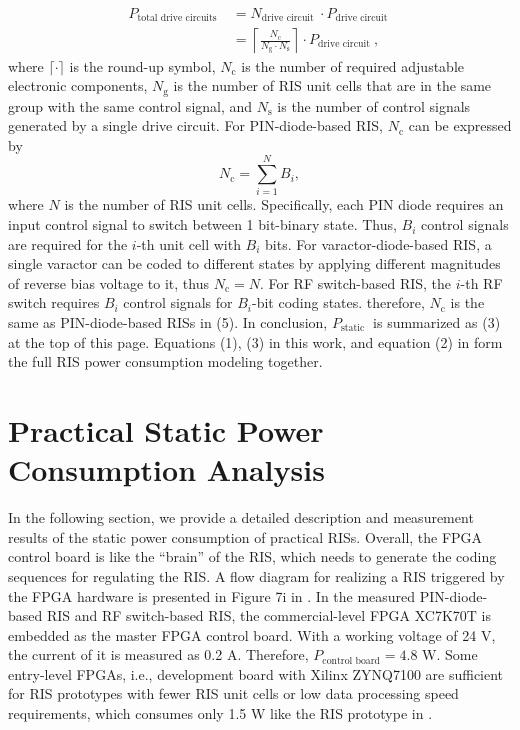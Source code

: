\documentclass[journal]{IEEEtran}
\begin{document}
\begin{equation}
\begin{aligned}
P_{\text {total drive circuits }} & =N_{\text {drive circuit }} \cdot P_{\text {drive circuit }} \\
&=\left\lceil\frac{N_{\mathrm{c}}}{N_{\text {g}} \cdot N_{\mathrm{s}}} \right\rceil \cdot P_{\text {drive circuit }},
\end{aligned}
\end{equation}
where $\lceil\cdot\rceil$ is the round-up symbol, $N_{\mathrm{c}}$ is the number of required adjustable electronic components, $N_{\text {g}}$ is the number of RIS unit cells that are in the same group with the same control signal, and $N_{\mathrm{s}}$ is the number of control signals generated by a single drive circuit.
For PIN-diode-based RIS, $N_{\mathrm{c}}$ can be expressed by 
\begin{equation}
N_{\mathrm{c}}=\sum_{i=1}^N B_i,
\end{equation}
where $N$ is the number of RIS unit cells. Specifically, each PIN diode requires an input control signal to switch between 1 bit-binary state. Thus, $B_i$ control signals are required for the ${i}$-th unit cell with $B_i$ bits. For varactor-diode-based RIS, a single varactor can be coded to different states by applying different magnitudes of reverse bias voltage to it, thus $N_{\mathrm{c}}=N$. For RF switch-based RIS, the ${i}$-th RF switch requires $B_i$ control signals for $B_i$-bit coding states.
therefore, $N_{\mathrm{c}}$ is the same as PIN-diode-based RISs in (5). In conclusion, $P_{\text {static }}$ is summarized as (3) at the top of this page. Equations (1), (3) in this work, and  equation (2) in \cite{wang2022reconfigurable} form the full RIS power consumption modeling together.

\section{Practical Static Power Consumption Analysis}
In the following section, we provide a detailed description and measurement results of the static power consumption of  practical RISs. Overall, the FPGA control board is like the “brain” of the RIS, which needs to generate the coding sequences for regulating the RIS. A flow diagram for realizing a RIS triggered by the FPGA hardware is presented in Figure 7i in \cite{cui2014coding}. In the measured PIN-diode-based RIS and RF switch-based RIS, the commercial-level FPGA XC7K70T is embedded as the master FPGA control board. With a working voltage of 24 V, the current of it is measured as 0.2 A. Therefore, $P_{\text {control board}}=4.8$ W. Some entry-level FPGAs, i.e., development board with Xilinx ZYNQ7100 are sufficient for RIS prototypes with fewer RIS unit cells or low data processing speed requirements, which consumes only 1.5 W like the RIS prototype in \cite{9551980}.
\end{document}
